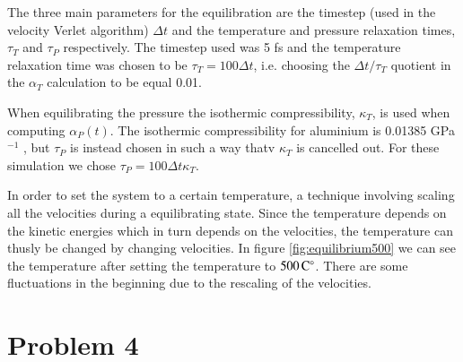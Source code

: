 The three main parameters for the equilibration are the timestep (used in the velocity Verlet algorithm) $\Delta t$ and the temperature and pressure relaxation times, $\tau_T$ and $\tau_P$ respectively. The timestep used was 5 fs and the temperature relaxation time was chosen to be $\tau_T = 100 \Delta t$, i.e. choosing the $\Delta t/\tau_T$ quotient in the $\alpha_T$ calculation to be equal 0.01.

When equilibrating the pressure the isothermic compressibility, $\kappa_T$, is used when computing $\alpha_P(t)$. The isothermic compressibility for aluminium is 0.01385 GPa$^{-1}$ \cite{knowledgedoor}, but $\tau_P$ is instead chosen in such a way thatv $\kappa_T$ is cancelled out. For these simulation we chose $\tau_P = 100\Delta t \kappa_T$.


In order to set the system to a certain temperature, a technique involving scaling all the velocities during a equilibrating state. Since the temperature depends on the kinetic energies which in turn depends on the velocities, the  temperature can thusly be changed by changing velocities. In figure \ref{fig:equilibrium500} we can see the temperature after setting the temperature to $\unit[500]{C^\circ}$. There are some fluctuations in the beginning due to the rescaling of the velocities.


\section*{Problem 4}

